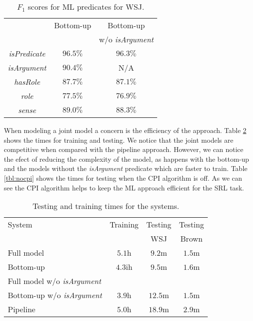 
\begin{table}[ht]

    \centering
    \begin{tabular}{|c|c|c|}\hline
                                  & Bottom-up  &  Bottom-up \\
                                  &            &  w/o \emph{isArgument} \\\hline 
        \emph{isPredicate}        & $96.5\%$   & $96.3\%$   \\
        \emph{isArgument}         & $90.4\%$   &   N/A      \\
        \emph{hasRole}            & $87.7\%$   & $87.1\%$   \\
        \emph{role}               & $77.5\%$   & $76.9\%$   \\
        \emph{sense}              & $89.0\%$   & $88.3\%$   \\
        \hline
    \end{tabular}
    \caption{$F_1$ scores for ML predicates for WSJ.}
    \label{tbl:predicates}
\end{table}


When modeling a joint model a concern is the efficiency of the approach. Table
\ref{tbl:times} shows the times for training and testing. We notice that the
joint models are competitive when compared with the pipeline approach. However,
we can notice the efect of reducing the complexity of the model, as happens with
the bottom-up and the models without the \emph{isArgument} predicate which are
faster to train. Table \ref{tbl:nocpi} shows the times for testing when the CPI
algorithm is off. As we can see the CPI algorithm helps to keep the ML approach
efficient for the SRL task.

\begin{table}[ht]

    \centering
    \begin{tabular}{|p{2.5cm}|c|c|c|}\hline
        System                           & Training & Testing   & Testing \\
                                         &          & WSJ       & Brown   \\\hline 
        Full model                       & $5.1$h   & $9.2$m    & $1.5$m  \\
        Bottom-up                        & $4.3$ih  & $9.5$m    & $1.6$m  \\
        Full model w/o \emph{isArgument} &          &           &         \\
        Bottom-up  w/o \emph{isArgument} & $3.9$h   & $12.5$m   & $1.5$m \\
        Pipeline                         & $5.0$h   & $18.9$m   & $2.9$m \\\hline
    \end{tabular}
    \caption{Testing and training times for the systems.}
    \label{tbl:times}
\end{table}


